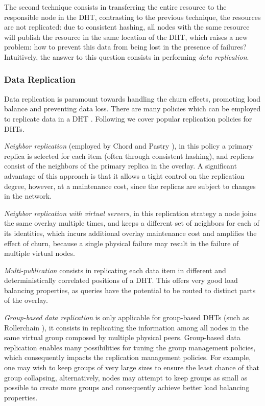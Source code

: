 The second technique consists in transferring the entire resource to the responsible node in the DHT, contrasting to the previous technique, the resources are not replicated: due to consistent hashing, all nodes with the same resource will publish the resource in the same location of the DHT, which raises a new problem: how to prevent this data from being lost in the presence of failures? Intuitively, the answer to this question consists in performing \textit{data replication}.

\subsubsection{Data Replication}

Data replication is paramount towards handling the churn effects, promoting load balance and preventing data loss. There are many policies which can be employed to replicate data in a DHT \cite{Policies_for_Efficient_Data_Replication_in_P2P_Systems}. Following we cover popular replication policies for DHTs.

\textit{Neighbor replication} (employed by Chord \cite{stoica2003chord} and Pastry \cite{rowstron2001pastry}), in this policy a primary replica is selected for each item (often through consistent hashing), and replicas consist of the neighbors of the primary replica in the overlay. A significant advantage of this approach is that it allows a tight control on the replication degree, however, at a maintenance cost, since the replicas are subject to changes in the network.

\textit{Neighbor replication with virtual servers}, in this replication strategy a node joins the same overlay multiple times, and keeps a different set of neighbors for each of its identities, which incurs additional overlay maintenance cost and amplifies the effect of churn, because a single physical failure may result in the failure of multiple virtual nodes. 

\textit{Multi-publication} consists in replicating each data item in different and deterministically correlated positions of a DHT. This offers very good load balancing properties, as queries have the potential to be routed to distinct parts of the overlay.

\textit{Group-based data replication} is only applicable for group-based DHTs (such as Rollerchain \cite{rollerchain}), it consists in replicating the information among all nodes in the same virtual group composed by multiple physical peers. Group-based data replication enables many possibilities for tuning the group management policies, which consequently impacts the replication management policies. For example, one may wish to keep groups of very large sizes to ensure the least chance of that group collapsing, alternatively, nodes may attempt to keep groups as small as possible to create more groups and consequently achieve better load balancing properties.

